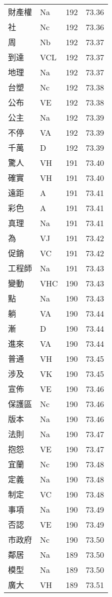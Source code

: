 \documentclass[twocolumn]{book}
\begin{document}
\begin{supertabular}{llrr}
財產權 & Na & 192 &  73.36\\
社 & Nc & 192 &  73.36\\
周 & Nb & 192 &  73.37\\
到達 & VCL & 192 &  73.37\\
地理 & Na & 192 &  73.37\\
台塑 & Nc & 192 &  73.38\\
公布 & VE & 192 &  73.38\\
公主 & Na & 192 &  73.39\\
不停 & VA & 192 &  73.39\\
千萬 & D & 192 &  73.39\\
驚人 & VH & 191 &  73.40\\
確實 & VH & 191 &  73.40\\
遠距 & A & 191 &  73.41\\
彩色 & A & 191 &  73.41\\
真理 & Na & 191 &  73.41\\
為 & VJ & 191 &  73.42\\
促銷 & VC & 191 &  73.42\\
工程師 & Na & 191 &  73.43\\
變動 & VHC & 190 &  73.43\\
點 & Na & 190 &  73.43\\
躺 & VA & 190 &  73.44\\
漸 & D & 190 &  73.44\\
進來 & VA & 190 &  73.44\\
普通 & VH & 190 &  73.45\\
涉及 & VK & 190 &  73.45\\
宣佈 & VE & 190 &  73.46\\
保護區 & Nc & 190 &  73.46\\
版本 & Na & 190 &  73.46\\
法則 & Na & 190 &  73.47\\
抱怨 & VE & 190 &  73.47\\
宜蘭 & Nc & 190 &  73.48\\
定義 & Na & 190 &  73.48\\
制定 & VC & 190 &  73.48\\
事項 & Na & 190 &  73.49\\
否認 & VE & 190 &  73.49\\
市政府 & Nc & 190 &  73.50\\
鄰居 & Na & 189 &  73.50\\
模型 & Na & 189 &  73.50\\
廣大 & VH & 189 &  73.51\\

\end{supertabular}
\end{document}

